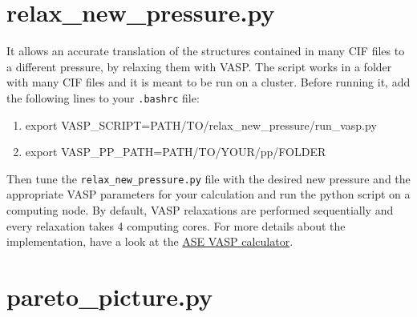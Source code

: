 \documentclass{article}
\begin{document}
\section{relax\_new\_pressure.py}
It allows an accurate translation of the structures contained in many CIF files to a different pressure, by relaxing them with VASP. The script works in a folder with many CIF files and it is meant to be run on a cluster. Before running it, add the following lines to your \texttt{.bashrc} file:
\begin{enumerate}
	\item export VASP\_SCRIPT=PATH/TO/relax\_new\_pressure/run\_vasp.py
	\item export VASP\_PP\_PATH=PATH/TO/YOUR/pp/FOLDER
\end{enumerate}
Then tune the \texttt{relax\_new\_pressure.py} file with the desired new pressure and the appropriate VASP parameters for your calculation and run the python script on a computing node. By default, VASP relaxations are performed sequentially and every relaxation takes 4 computing cores. For more details about the implementation, have a look at the \href{https://wiki.fysik.dtu.dk/ase/ase/calculators/vasp.html}{ASE VASP calculator}.

\section{pareto\_picture.py}
\end{document}
